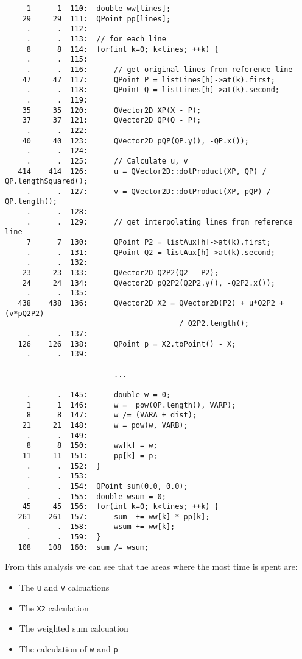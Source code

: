 \documentclass[12pt]{article}
\begin{document}
\begin{lstlisting}
     1      1  110:  double ww[lines];
    29     29  111:  QPoint pp[lines];
     .      .  112:
     .      .  113:  // for each line
     8      8  114:  for(int k=0; k<lines; ++k) {
     .      .  115:
     .      .  116:      // get original lines from reference line
    47     47  117:      QPoint P = listLines[h]->at(k).first;
     .      .  118:      QPoint Q = listLines[h]->at(k).second;
     .      .  119:
    35     35  120:      QVector2D XP(X - P);
    37     37  121:      QVector2D QP(Q - P);
     .      .  122:
    40     40  123:      QVector2D pQP(QP.y(), -QP.x());
     .      .  124:
     .      .  125:      // Calculate u, v
   414    414  126:      u = QVector2D::dotProduct(XP, QP) /  QP.lengthSquared();
     .      .  127:      v = QVector2D::dotProduct(XP, pQP) / QP.length();
     .      .  128:
     .      .  129:      // get interpolating lines from reference line
     7      7  130:      QPoint P2 = listAux[h]->at(k).first;
     .      .  131:      QPoint Q2 = listAux[h]->at(k).second;
     .      .  132:
    23     23  133:      QVector2D Q2P2(Q2 - P2);
    24     24  134:      QVector2D pQ2P2(Q2P2.y(), -Q2P2.x());
     .      .  135:
   438    438  136:      QVector2D X2 = QVector2D(P2) + u*Q2P2 + (v*pQ2P2)
                                        / Q2P2.length();
     .      .  137:
   126    126  138:      QPoint p = X2.toPoint() - X;
     .      .  139:

                         ...

     .      .  145:      double w = 0;
     1      1  146:      w =  pow(QP.length(), VARP);
     8      8  147:      w /= (VARA + dist);
    21     21  148:      w = pow(w, VARB);
     .      .  149:
     8      8  150:      ww[k] = w;
    11     11  151:      pp[k] = p;
     .      .  152:  }
     .      .  153:
     .      .  154:  QPoint sum(0.0, 0.0);
     .      .  155:  double wsum = 0;
    45     45  156:  for(int k=0; k<lines; ++k) {
   261    261  157:      sum  += ww[k] * pp[k];
     .      .  158:      wsum += ww[k];
     .      .  159:  }
   108    108  160:  sum /= wsum;
\end{lstlisting}

From this analysis we can see that the areas where the most time is spent are:


\begin{itemize}
  \item The \texttt{u} and \texttt{v} calcuations
  \item The \texttt{X2} calculation
  \item The weighted sum calcuation
  \item The calculation of \texttt{w} and \texttt{p}
\end{itemize}
\end{document}

